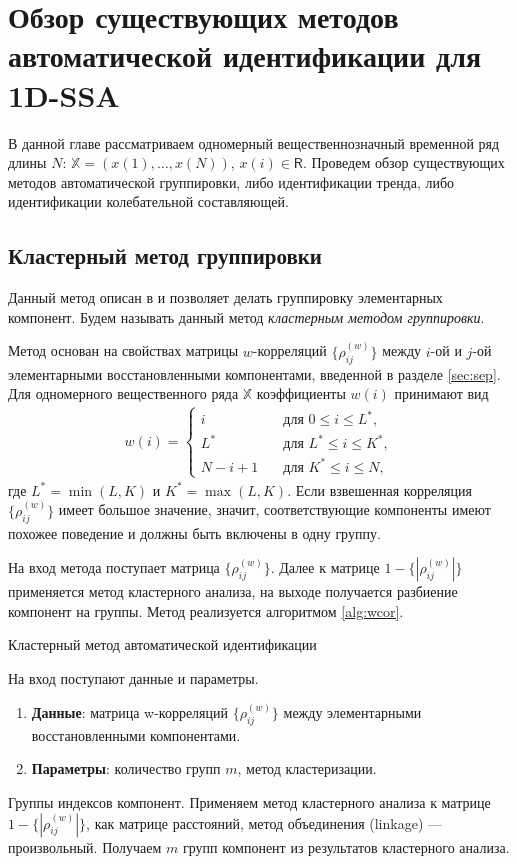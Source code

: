 \documentclass[specialist,
               substylefile = spbu.rtx,
               subf,href,colorlinks=true, 12pt]{disser}
\begin{document}
\chapter{Обзор существующих методов автоматической идентификации для 1D-SSA}
\label{sec:1d_methods}
В данной главе рассматриваем одномерный вещественнозначный временной ряд длины $N$: $\mathbb{X}= (x(1),\ldots,x(N))$, $x(i) \in \mathsf{R}$. Проведем обзор существующих методов автоматической группировки, либо идентификации тренда, либо идентификации колебательной составляющей.

\section{Кластерный метод группировки} \label{sec:1D_wcor}
Данный метод описан в \cite{Golyandina.Zhigljavsky2012} и позволяет делать группировку элементарных компонент.
Будем называть данный метод \textit{кластерным методом группировки}.

Метод основан на свойствах матрицы $w$-корреляций $\{\rho^{(w)}_{ij}\}$ между $i$-ой и $j$-ой элементарными восстановленными компонентами, введенной в разделе \ref{sec:sep}.
Для одномерного вещественного ряда $\mathbb{X}$ коэффициенты $w(i)$ принимают вид
\begin{gather} \label{eq:w_i}
 w(i) =
\begin{cases}
i &\quad \text{для } 0 \leqslant i \leqslant L^*, \\
L^* & \quad \text{для } L^* \leqslant i \leqslant K^*, \\
N - i + 1 & \quad \text{для } K^* \leqslant i \leqslant N,
\end{cases}
\end{gather}
где $L^* = \min(L,K)$ и $K^* = \max(L,K)$.
Если взвешенная корреляция $\{\rho^{(w)}_{ij}\}$ имеет большое значение, значит, соответствующие компоненты имеют похожее поведение и должны быть включены в одну группу.

На вход метода поступает матрица $\{\rho^{(w)}_{ij}\}$. Далее к матрице $1 -\{|\rho^{(w)}_{ij}|\}$ применяется метод кластерного анализа, на выходе получается разбиение компонент на группы. Метод реализуется алгоритмом \ref{alg:wcor}.

 \begin{algorithm}[!hhh]
\caption{Кластерный метод автоматической идентификации}
\label{alg:wcor}
\begin{algorithmic}[1]
\REQUIRE На вход поступают данные и параметры.
\begin{enumerate}
\item \textbf{Данные}: матрица w-корреляций $\{\rho^{(w)}_{ij}\}$ между элементарными восстановленными компонентами.
\item \textbf{Параметры}: количество групп $m$, метод кластеризации.
\end{enumerate}
\ENSURE Группы индексов компонент.
\STATE  Применяем метод кластерного анализа к матрице $1 -\{|\rho^{(w)}_{ij}|\}$, как матрице расстояний, метод объединения (linkage) --- произвольный.
\STATE Получаем $m$ групп компонент из результатов кластерного анализа.
\end{algorithmic}
\end{algorithm}
\end{document}
